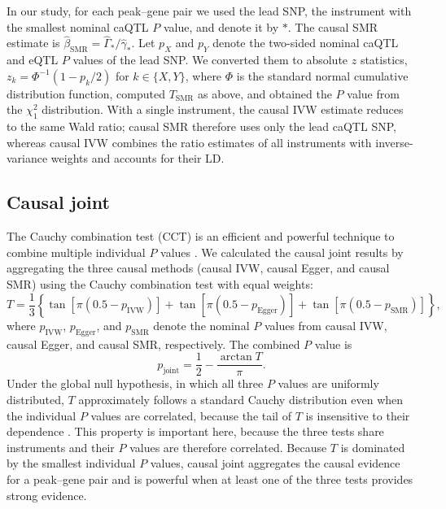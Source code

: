 \noindent In our study, for each peak--gene pair we used the lead SNP, the instrument with the smallest nominal caQTL $P$ value, and denote it by $*$. The causal SMR estimate is $\hat{\beta}_{\mathrm{SMR}}=\hat{\Gamma}_*/\hat{\gamma}_*$. Let $p_X$ and $p_Y$ denote the two-sided nominal caQTL and eQTL $P$ values of the lead SNP. We converted them to absolute $z$ statistics, $z_k=\Phi^{-1}(1-p_k/2)$ for $k\in\{X,Y\}$, where $\Phi$ is the standard normal cumulative distribution function, computed $T_{\mathrm{SMR}}$ as above, and obtained the $P$ value from the $\chi^2_1$ distribution. With a single instrument, the causal IVW estimate reduces to the same Wald ratio; causal SMR therefore uses only the lead caQTL SNP, whereas causal IVW combines the ratio estimates of all instruments with inverse-variance weights and accounts for their LD.

\subsection{Causal joint}
\label{sec:cct}
The Cauchy combination test (CCT) is an efficient and powerful technique to combine multiple individual $P$ values \cite{liu2020cauchy}. We calculated the causal joint results by aggregating the three causal methods (causal IVW, causal Egger, and causal SMR) using the Cauchy combination test with equal weights:
\begin{equation*}
T = \frac{1}{3}\left\{\tan\left[\pi(0.5 - p_{\mathrm{IVW}})\right] + \tan\left[\pi(0.5 - p_{\mathrm{Egger}})\right] + \tan\left[\pi(0.5 - p_{\mathrm{SMR}})\right]\right\},
\end{equation*}
where $p_{\mathrm{IVW}}$, $p_{\mathrm{Egger}}$, and $p_{\mathrm{SMR}}$ denote the nominal $P$ values from causal IVW, causal Egger, and causal SMR, respectively. The combined $P$ value is
\begin{equation*}
p_{\mathrm{joint}} = \frac{1}{2}-\frac{\arctan T}{\pi}.
\end{equation*}
Under the global null hypothesis, in which all three $P$ values are uniformly distributed, $T$ approximately follows a standard Cauchy distribution even when the individual $P$ values are correlated, because the tail of $T$ is insensitive to their dependence \cite{liu2020cauchy}. This property is important here, because the three tests share instruments and their $P$ values are therefore correlated. Because $T$ is dominated by the smallest individual $P$ values, causal joint aggregates the causal evidence for a peak--gene pair and is powerful when at least one of the three tests provides strong evidence.


